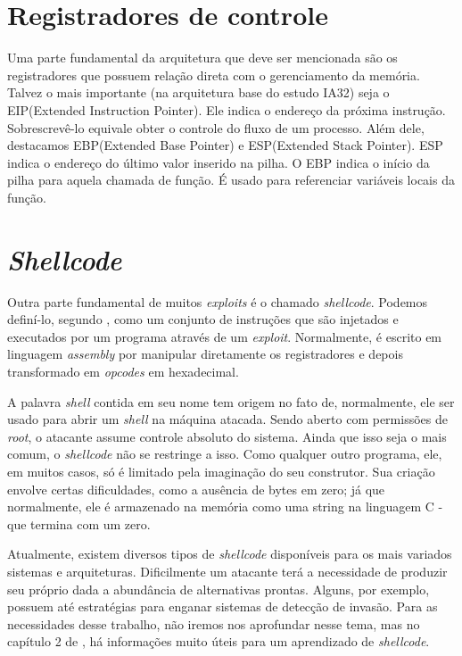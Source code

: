 	\section{Registradores de controle}
	Uma parte fundamental da arquitetura que deve ser mencionada são os registradores que possuem
	relação direta com o gerenciamento da memória.
	Talvez o mais importante (na arquitetura base do estudo IA32) seja o EIP(Extended Instruction Pointer).
	Ele indica o endereço da próxima instrução. Sobrescrevê-lo equivale obter o controle
	do fluxo de um processo.
	Além dele, destacamos EBP(Extended Base Pointer) e ESP(Extended Stack Pointer).
	ESP indica o endereço do último valor inserido na pilha.
	O EBP indica o início da pilha para aquela chamada de função. É usado para referenciar variáveis
	locais da função.

	\section{\textsl{Shellcode}}
	Outra parte fundamental de muitos \textsl{exploits} é o chamado \textsl{shellcode}.
	Podemos definí-lo, segundo \cite{Anley2007}, como um conjunto de instruções que são injetados
	e executados por um programa através de um \textsl{exploit}. Normalmente, é escrito em linguagem
	\textsl{assembly} por manipular diretamente os registradores e depois transformado em \textsl{opcodes}
	em hexadecimal.


	A palavra \textsl{shell} contida em seu nome tem origem no fato de, normalmente, ele ser usado
	para abrir um \textsl{shell} na máquina atacada. Sendo aberto com permissões de \textsl{root},
	o atacante assume controle absoluto do sistema. Ainda que isso seja o mais comum, o \textsl{shellcode}
	não se restringe a isso. Como qualquer outro programa, ele, em muitos casos, só é limitado pela imaginação
	do seu construtor. Sua criação envolve certas dificuldades, como a ausência de bytes em zero; já que
	normalmente, ele é armazenado na memória como uma string na linguagem C - que termina com um zero.
	

	Atualmente, existem diversos tipos de \textsl{shellcode} disponíveis para os mais variados
	sistemas e arquiteturas. Dificilmente um atacante terá a necessidade de produzir seu próprio
	dada a abundância de alternativas prontas. Alguns, por exemplo, possuem até estratégias para enganar 
	sistemas de detecção de invasão. Para as necessidades desse trabalho, não iremos nos aprofundar
	nesse tema, mas no capítulo 2 de \cite{Anley2007}, há informações muito úteis para um aprendizado
	de \textsl{shellcode}.
